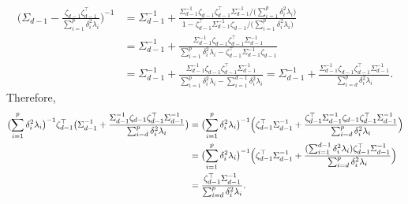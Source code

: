 \documentclass[10pt]{article}
\begin{document}
\begin{equation*}
\begin{split}
(\Sigma_{d-1} - \frac{\zeta_{d-1} \zeta_{d-1}^{\top}}{\sum_{i=1}^{p} \delta_i^{2} \lambda_i}\bigr)^{-1} &= \Sigma_{d-1}^{-1} + \frac{\Sigma_{d-1}^{-1} \zeta_{d-1} \zeta_{d-1}^{\top} \Sigma_{d-1}^{-1}/ \bigl(\sum_{i=1}^{p} \delta_i^{2} \lambda_i\bigr)}{1 - \zeta_{d-1}^{\top} \Sigma_{d-1}^{-1} \zeta_{d-1}/\bigl(\sum_{i=1}^{p} \delta_i^{2} \lambda_i\bigr)} \\
&= \Sigma_{d-1}^{-1} + \frac{\Sigma_{d-1}^{-1} \zeta_{d-1} \zeta_{d-1}^{\top} \Sigma_{d-1}^{-1}}{\sum_{i=1}^{p} \delta_i^{2} \lambda_i - \zeta_{d-1}^{\top} \Sigma_{d-1}^{-1} \zeta_{d-1}} \\
&= \Sigma_{d-1}^{-1} + \frac{\Sigma_{d-1}^{-1} \zeta_{d-1} \zeta_{d-1}^{\top} \Sigma_{d-1}^{-1}}{\sum_{i=1}^{p} \delta_i^{2} \lambda_i - \sum_{i=1}^{d-1} \delta_i^{2} \lambda_i} = \Sigma_{d-1}^{-1} + \frac{\Sigma_{d-1}^{-1} \zeta_{d-1} \zeta_{d-1}^{\top} \Sigma_{d-1}^{-1}}{\sum_{i=d}^{p} \delta_i^{2} \lambda_i}.
\end{split}
\end{equation*}
Therefore,
\begin{equation*}
\begin{split}
\bigl(\sum_{i=1}^{p} \delta_i^{2} \lambda_i\bigr)^{-1} \zeta_{d-1}^{\top} \bigl(\Sigma_{d-1}^{-1} + \frac{\Sigma_{d-1}^{-1} \zeta_{d-1} \zeta_{d-1}^{\top} \Sigma_{d-1}^{-1}}{\sum_{i=d}^{p} \delta_i^{2} \lambda_i} \bigr) &= \bigl(\sum_{i=1}^{p} \delta_i^{2} \lambda_i\bigr)^{-1} \Bigl(\zeta_{d-1}^{\top} \Sigma_{d-1}^{-1} + \frac{\zeta_{d-1}^{\top} \Sigma_{d-1}^{-1} \zeta_{d-1} \zeta_{d-1}^{\top} \Sigma_{d-1}^{-1}}{\sum_{i=d}^{p} \delta_i^{2} \lambda_i} \Bigr) \\
&= \bigl(\sum_{i=1}^{p} \delta_i^{2} \lambda_i\bigr)^{-1} \Bigl(\zeta_{d-1}^{\top} \Sigma_{d-1}^{-1} + \frac{(\sum_{i=1}^{d-1} \delta_i^{2} \lambda_i)
\zeta_{d-1}^{\top} \Sigma_{d-1}^{-1}}{\sum_{i=d}^{p} \delta_i^{2} \lambda_i}\Bigr) \\
& = \frac{\zeta_{d-1}^{\top} \Sigma_{d-1}^{-1}}{\sum_{i=d}^{p} \delta_i^{2} \lambda_i}.
\end{split}
\end{equation*}
\end{document}
